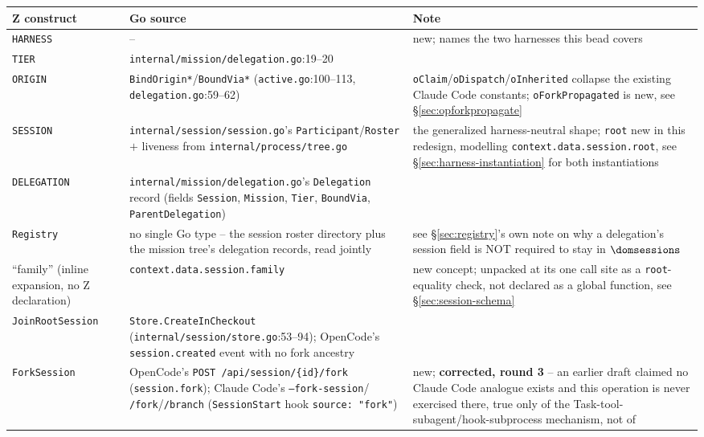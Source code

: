 \documentclass[a4paper,10pt,fleqn]{article}
\newcommand{\fpath}[1]{\texttt{#1}}
\newcommand{\field}[1]{\texttt{#1}}
\begin{document}
\begin{center}
\begin{tabularx}{\textwidth}{@{}llX@{}}
\toprule
\textbf{Z construct} & \textbf{Go source} & \textbf{Note} \\
\midrule
\field{HARNESS} & -- & new; names the two harnesses this bead covers \\
\field{TIER} & \fpath{internal/mission/delegation.go}:19--20 & \\
\field{ORIGIN} & \field{BindOrigin*}/\field{BoundVia*}
  (\fpath{active.go}:100--113, \fpath{delegation.go}:59--62) &
  \field{oClaim}/\field{oDispatch}/\field{oInherited} collapse the
  existing Claude Code constants; \field{oForkPropagated} is new, see
  \S\ref{sec:opforkpropagate} \\
\field{SESSION} & \fpath{internal/session/session.go}'s
  \field{Participant}/\field{Roster} $+$ liveness from
  \fpath{internal/process/tree.go} & the generalized harness-neutral
  shape; \field{root} new in this redesign, modelling
  \field{context.data.session.root}, see
  \S\ref{sec:harness-instantiation} for both instantiations \\
\field{DELEGATION} & \fpath{internal/mission/delegation.go}'s
  \field{Delegation} record (fields \field{Session}, \field{Mission},
  \field{Tier}, \field{BoundVia}, \field{ParentDelegation}) & \\
\field{Registry} & no single Go type -- the session roster directory
  plus the mission tree's delegation records, read jointly & see
  \S\ref{sec:registry}'s own note on why a delegation's session field
  is NOT required to stay in $\dom \field{sessions}$ \\
``family'' (inline expansion, no Z declaration) &
  \field{context.data.session.family} & new concept; unpacked at its
  one call site as a \field{root}-equality check, not declared as a
  global function, see \S\ref{sec:session-schema} \\
\field{JoinRootSession} & \field{Store.CreateInCheckout}
  (\fpath{internal/session/store.go}:53--94); OpenCode's
  \field{session.created} event with no fork ancestry & \\
\field{ForkSession} & OpenCode's \field{POST /api/session/\{id\}/fork}
  (\field{session.fork}); Claude Code's \field{--fork-session}/
  \field{/fork}/\field{/branch} (\field{SessionStart} hook
  \field{source: "fork"}) & new; \textbf{corrected, round 3} -- an
  earlier draft claimed no Claude Code analogue exists and this
  operation is never exercised there, true only of the Task-tool-
  subagent/hook-subprocess mechanism, not of

\end{tabularx}
\end{center}
\end{document}
